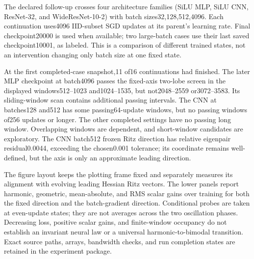 The declared follow-up crosses four architecture families (SiLU MLP, SiLU CNN, ResNet-32, and WideResNet-10-2) with batch sizes32,128,512,4096. Each continuation uses4096 IID-subset SGD updates at its parent's learning rate. Final checkpoint20000 is used when available; two large-batch cases use their last saved checkpoint10001, as labeled. This is a comparison of different trained states, not an intervention changing only batch size at one fixed state.

At the first completed-case snapshot,11 of16 continuations had finished. The later MLP checkpoint at batch4096 passes the fixed-axis two-lobe screen in the displayed windows512--1023 and1024--1535, but not2048--2559 or3072--3583. Its sliding-window scan contains additional passing intervals. The CNN at batches128 and512 has some passing64-update windows, but no passing windows of256 updates or longer. The other completed settings have no passing long window. Overlapping windows are dependent, and short-window candidates are exploratory. The CNN batch512 frozen Ritz direction has relative eigenpair residual0.0044, exceeding the chosen0.001 tolerance; its coordinate remains well-defined, but the axis is only an approximate leading direction.

The figure layout keeps the plotting frame fixed and separately measures its alignment with evolving leading Hessian Ritz vectors. The lower panels report harmonic, geometric, mean-absolute, and RMS scalar gains over training for both the fixed direction and the batch-gradient direction. Conditional probes are taken at even-update states; they are not averages across the two oscillation phases. Decreasing loss, positive scalar gains, and finite-window occupancy do not establish an invariant neural law or a universal harmonic-to-bimodal transition. Exact source paths, arrays, bandwidth checks, and run completion states are retained in the experiment package.
